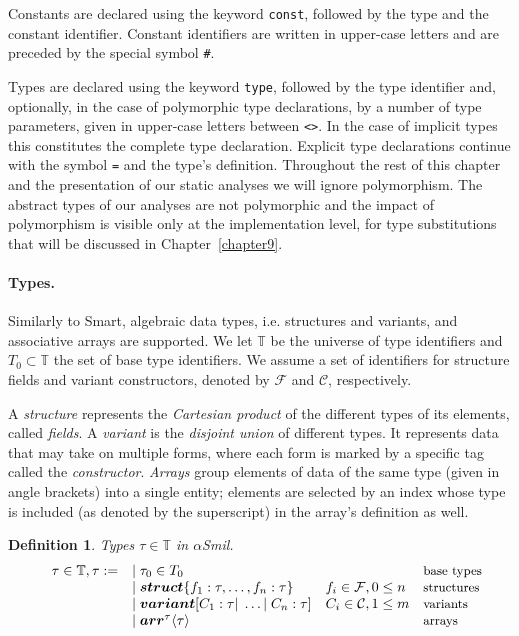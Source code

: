 \documentclass[11pt]{article}
\newtheorem{definition}{Definition}
\def\slang{\textsf{Smart}}
\newcommand{\disp}[1]{\lstinline&#1&}
\def\fset{\ensuremath{\mathcal{F}}}
\def\cset{\ensuremath{\mathcal{C}}}
\newcommand{\plainstype}[6]
{\ensuremath{\boldsymbol{struct}\{#1_{#2}: #3, \ldots, #4_{#5}: #6 \}}}
\def\commonstype{\plainstype{f}{1}{\tau}{f}{n}{\tau}}
\newcommand{\plainvtype}[6]
{\ensuremath{\boldsymbol{variant}[#1_{#2}: #3 \ver \ldots \ver #4_{#5}: #6]}}
\def\commonvtype{\plainvtype{C}{1}{\tau}{C}{n}{\tau}}
\newcommand{\plainatype}[2]
{\ensuremath{\boldsymbol{arr}^{#1} \langle #2 \rangle}}
\def\commonatype{\plainatype{\tau}{\tau}}
\def\asmil{\textsf{$\alpha$Smil}}
\newcommand{\ver}{\arrowvert \;}
\begin{document}
Constants are declared using the keyword \disp{const}, followed by the type and 
the constant identifier. Constant identifiers are written in upper-case letters
and are preceded by the special symbol \disp{#}.

Types are declared using the keyword \disp{type}, followed by the type identifier
and, optionally, in the case of polymorphic type declarations, by a number of type 
parameters, given in upper-case letters between \disp{<>}. In the case of implicit
types this constitutes the complete type declaration. Explicit type declarations 
continue with the symbol \disp{=} and the type's definition. Throughout the rest 
of this chapter and the presentation of our static analyses we will ignore 
polymorphism. The abstract types of our analyses are not polymorphic and the
impact of polymorphism is visible only at the implementation level, for type 
substitutions that will be discussed in Chapter~\ref{chapter9}.
 

\paragraph{Types.} Similarly to {\slang}, algebraic data types, i.e. structures
and variants, and associative arrays are supported. We let $\mathbb{T}$ be the 
universe of type identifiers and 
$T_0 \subset \mathbb{T}$ the set of base type 
identifiers. We assume a set of identifiers for structure fields and variant
constructors, denoted by $\fset$ and $\cset$, respectively. 

A \emph{structure} represents the \emph{Cartesian product} of the different 
types of its elements, called \emph{fields}. A \emph{variant} is the 
\emph{disjoint union} of different types. It represents data that may take on 
multiple forms, where each form is marked by a specific tag called the 
\emph{constructor}. \emph{Arrays} group elements of data of the same type (given 
in angle brackets) into a single entity; elements are selected by an index whose 
type is included (as denoted by the superscript) in the array's definition as
well.
%
\begin{definition}{Types $\tau \in \mathbb{T}$ in {\asmil}.}\label{ch4:types:def}
\[
\begin{array}{llll}
  \phantom{aa}\tau \in \mathbb{T}, 
  \tau :=  &\ver \tau_0 \in T_0 &&\textrm{\small{base types}} 
           \\
           &\ver \commonstype        & f_i \in \mathcal{F}, 0 \leq n
                                     &\textrm{\small{structures}} 
           \\
           &\ver \commonvtype        & C_i \in \mathcal{C}, 1 \leq m
                                     & \textrm{\small{variants}} 
           \\
           &\ver \commonatype        & &\textrm{\small{arrays}}
\end{array}
\]
\end{definition}
\end{document}
